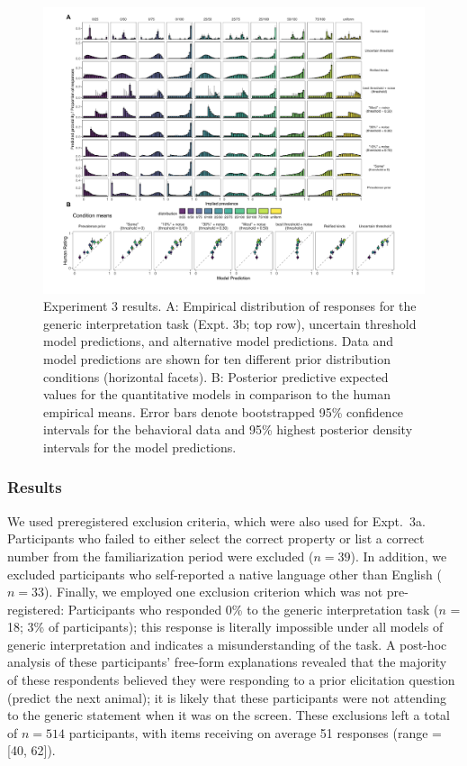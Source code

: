 \documentclass[floatsintext,doc]{apa6}
\begin{document}
\begin{figure}
\centering
\includegraphics{figs/expt2_model-results_nozero2.pdf}
\caption{\label{fig:genint-modelingResults2}Experiment 3 results. A: Empirical distribution of responses for the generic interpretation task (Expt. 3b; top row), uncertain threshold model predictions, and alternative model predictions. Data and model predictions are shown for ten different prior distribution conditions (horizontal facets). B: Posterior predictive expected values for the quantitative models in comparison to the human empirical means. Error bars denote bootstrapped 95\% confidence intervals for the behavioral data and 95\% highest posterior density intervals for the model predictions.}
\end{figure}



\hypertarget{results-2}{%
\subsubsection{Results}\label{results-2}}

We used preregistered exclusion criteria, which were also used for Expt.~3a.
Participants who failed to either select the correct property or list a correct number from the familiarization period were excluded (\(n = 39\)).
In addition, we excluded participants who self-reported a native language other than English (\(n = 33\)).
Finally, we employed one exclusion criterion which was not pre-registered: Participants who responded 0\% to the generic interpretation task ($n$ = 18; 3\% of participants); this response is literally impossible under all models of generic interpretation and indicates a misunderstanding of the task. 
A post-hoc analysis of these participants' free-form explanations revealed that the majority of these respondents believed they were responding to a prior elicitation question (predict the next animal); it is likely that these participants were not attending to the generic statement when it was on the screen.
These exclusions left a total of \(n = 514\) participants, with items receiving on average 51 responses (range = {[}40, 62{]}).
\end{document}
